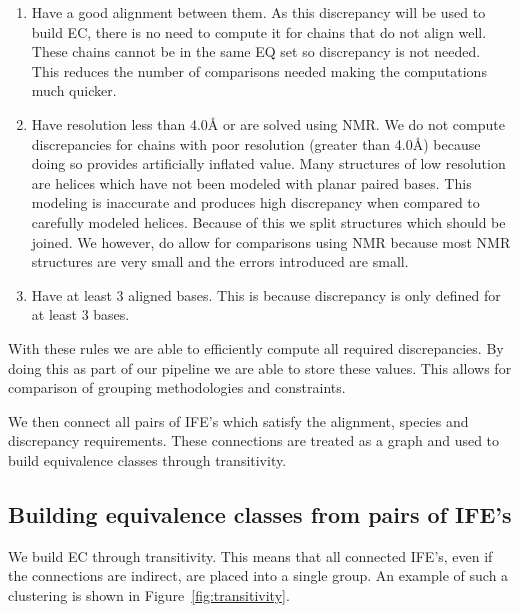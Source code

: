 \begin{enumerate}
  \item Have a good alignment between them. As this discrepancy will be used to
    build EC, there is no need to compute it for chains that do not align well.
    These chains cannot be in the same EQ set so discrepancy is not needed. This
    reduces the number of comparisons needed making the computations much
    quicker.

  \item Have resolution less than 4.0{\AA} or are solved using NMR. We do not
    compute discrepancies for chains with poor resolution (greater than 4.0{\AA})
    because doing so provides artificially inflated value. Many structures of
    low resolution are helices which have not been modeled with planar paired
    bases. This modeling is inaccurate and produces high discrepancy when
    compared to carefully modeled helices. Because of this we split structures
    which should be joined. We however, do allow for comparisons using NMR
    because most NMR structures are very small and the errors introduced are
    small.

  \item Have at least 3 aligned bases. This is because discrepancy is only
    defined for at least 3 bases.

\end{enumerate}

With these rules we are able to efficiently compute all required discrepancies.
By doing this as part of our pipeline we are able to store these values. This
allows for comparison of grouping methodologies and constraints.

We then connect all pairs of IFE’s which satisfy the alignment, species and
discrepancy requirements. These connections are treated as a graph and used to
build equivalence classes through transitivity.

\subsection{Building equivalence classes from pairs of IFE’s}

We build EC through transitivity. This means that all connected IFE’s, even if
the connections are indirect, are placed into a single group. An example of such
a clustering is shown in Figure~\ref{fig:transitivity}.

